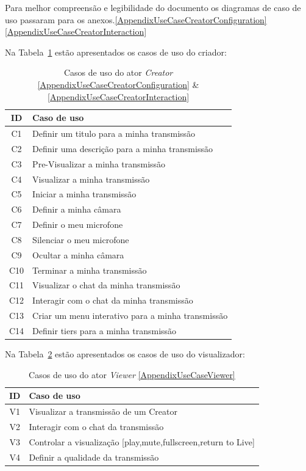 Para melhor compreensão e legibilidade do documento os diagramas de caso de uso passaram para os anexos.\ref{AppendixUseCaseCreatorConfiguration}  \ref{AppendixUseCaseCreatorInteraction}

Na Tabela~\ref{tab:uc-creator} estão apresentados os casos de uso do criador:

\begin{table}[H]
\centering
\caption{Casos de uso do ator \textit{Creator} \ref{AppendixUseCaseCreatorConfiguration} \& \ref{AppendixUseCaseCreatorInteraction}}
\label{tab:uc-creator}
\small
\begin{tabular}{|c|p{11cm}|}
\hline
\textbf{ID} & \textbf{Caso de uso} \\ \hline
C1  & Definir um titulo para a minha transmissão \\ \hline
C2  & Definir uma descrição para a minha transmissão \\ \hline
C3  & Pre-Visualizar a minha transmissão \\ \hline
C4  & Visualizar a minha transmissão \\ \hline
C5  & Iniciar a minha transmissão \\ \hline
C6  & Definir a minha câmara \\ \hline
C7  & Definir o meu microfone \\ \hline
C8  & Silenciar o meu microfone \\ \hline
C9  & Ocultar a minha câmara \\ \hline
C10 & Terminar a minha transmissão \\ \hline
C11 & Visualizar o chat da minha transmissão \\ \hline
C12 & Interagir com o chat da minha transmissão \\ \hline
C13 & Criar um menu interativo para a minha transmissão \\ \hline
C14 & Definir tiers para a minha transmissão \\ \hline
\end{tabular}
\end{table}

Na Tabela~\ref{tab:uc-viewer} estão apresentados os casos de uso do visualizador:
\begin{table}[H]
\centering
\caption{Casos de uso do ator \textit{Viewer} \ref{AppendixUseCaseViewer}}
\label{tab:uc-viewer}
\small
\begin{tabular}{|c|p{11cm}|}
\hline
\textbf{ID} & \textbf{Caso de uso} \\ \hline
V1 & Visualizar a transmissão de um Creator \\ \hline
V2 & Interagir com o chat da transmissão \\ \hline
V3 & Controlar a visualização [play,mute,fullscreen,return to Live] \\ \hline
V4 & Definir a qualidade da transmissão \\ \hline
\end{tabular}
\end{table}



